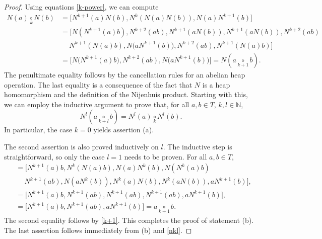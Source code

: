 \documentclass[pdftex]{sigma}
\numberwithin{equation}{section}
\newcommand{\N}{\mathbb N}
\def\nij#1{{\underset{#1}{\circ}}}
\begin{document}
\begin{proof}
Using equations \eqref{k-power}, we can compute
\begin{align*}
 N(a)\nij k N(b) &= \big[N^{k+1}(a)N(b), N^{k}(N(a)N(b)), N(a)N^{k+1}(b)\big]\\
 &= \big[N(N^{k+1}(a)b),N^{k+2}(ab),N^{k+1}(aN(b)),N^{k+1}(aN(b)), N^{k+2}(ab)\\
 &\quad\ N^{k+1}(N(a)b),N\big(aN^{k+1}(b)\big),N^{k+2}(ab),N^{k+1}(N(a)b) \big]\\
 &= \big[N\big(N^{k+1}(a)b\big), N^{k+2}(ab),N\big(aN^{k+1}(b)\big) \big]
 = N(a\nij{k+1}b).
\end{align*}
The penultimate equality follows by the cancellation rules for an abelian heap operation. The last equality is a consequence of the fact that $N$ is a heap homomorphism and the definition of the Nijenhuis product. Starting with this, we can employ the inductive argument to prove that, for all $a,b\in T$, $k,l\in \N$,
\begin{equation}\label{nkl}
N^l(a\nij{k+l} b) = N^l(a)\nij k N^l(b).
\end{equation}
In particular, the case $k=0$ yields assertion (a).

The second assertion is also proved inductively on $l$. The inductive step is straightforward, so only the case $l=1$ needs to be proven. For all $a,b\in T$,
\begin{align*}
 [N(a)\nij k b, N(a\nij k b), a\nij k N(b)] &= \big[N^{k+1}(a)b, N^k(N(a)b), N(a)N^k(b),N(N^k(a)b)\\
 &\quad\ N^{k+1}(ab), N(aN^k(b)), N^k(a)N(b), N^k(aN(b)), aN^{k+1}(b)\big],\\
 &= \big[N^{k+1}(a)b, N^{k+1}(ab), N^{k+1}(ab),N^{k+1}(ab), aN^{k+1}(b)\big], \\
 &= \big[N^{k+1}(a)b,N^{k+1}(ab), aN^{k+1}(b)\big] = a\nij{k+1}b.
\end{align*}
The second equality follows by \eqref{k+1}. This completes the proof of statement (b). The last assertion follows immediately from (b) and \eqref{nkl}.
\end{proof}
\end{document}
